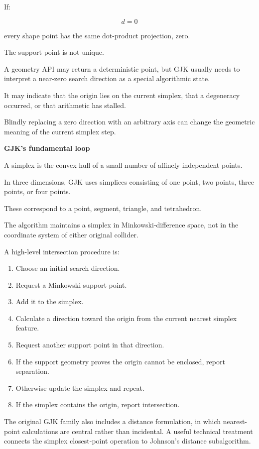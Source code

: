 If:

\[
d=0
\]

every shape point has the same dot-product projection, zero.

The support point is not unique.

A geometry API may return a deterministic point, but GJK usually needs to interpret a near-zero search direction as a special algorithmic state.

It may indicate that the origin lies on the current simplex, that a degeneracy occurred, or that arithmetic has stalled.

Blindly replacing a zero direction with an arbitrary axis can change the geometric meaning of the current simplex step.

\textbf{GJK's fundamental loop}

A simplex is the convex hull of a small number of affinely independent points.

In three dimensions, GJK uses simplices consisting of one point, two points, three points, or four points.

These correspond to a point, segment, triangle, and tetrahedron.

The algorithm maintains a simplex in Minkowski-difference space, not in the coordinate system of either original collider.

A high-level intersection procedure is:

\begin{enumerate}
\def\labelenumi{\arabic{enumi}.}
\tightlist
\item
  Choose an initial search direction.
\item
  Request a Minkowski support point.
\item
  Add it to the simplex.
\item
  Calculate a direction toward the origin from the current nearest simplex feature.
\item
  Request another support point in that direction.
\item
  If the support geometry proves the origin cannot be enclosed, report separation.
\item
  Otherwise update the simplex and repeat.
\item
  If the simplex contains the origin, report intersection.
\end{enumerate}

The original GJK family also includes a distance formulation, in which nearest-point calculations are central rather than incidental. A useful technical treatment connects the simplex closest-point operation to Johnson's distance subalgorithm. 

